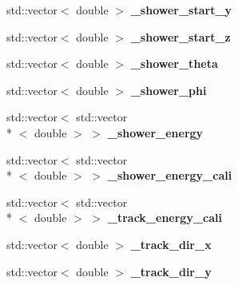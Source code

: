 \begin{DoxyCompactItemize}
\item 
\hypertarget{group__lee_gae12d2a6c7e2d78fc9d7e6f30ce959fa7}{std\-::vector$<$ double $>$ {\bfseries \-\_\-shower\-\_\-start\-\_\-y}}\label{group__lee_gae12d2a6c7e2d78fc9d7e6f30ce959fa7}

\item 
\hypertarget{group__lee_gafef1c0810411173778fa2ea099cbb03f}{std\-::vector$<$ double $>$ {\bfseries \-\_\-shower\-\_\-start\-\_\-z}}\label{group__lee_gafef1c0810411173778fa2ea099cbb03f}

\item 
\hypertarget{group__lee_ga3ad8af27c4c242410ffe4c1e1407e3c0}{std\-::vector$<$ double $>$ {\bfseries \-\_\-shower\-\_\-theta}}\label{group__lee_ga3ad8af27c4c242410ffe4c1e1407e3c0}

\item 
\hypertarget{group__lee_ga97c2d25dc1e253d867353b1c4562967c}{std\-::vector$<$ double $>$ {\bfseries \-\_\-shower\-\_\-phi}}\label{group__lee_ga97c2d25dc1e253d867353b1c4562967c}

\item 
\hypertarget{group__lee_gaf1fab9490fef935944f24feb7450f76c}{std\-::vector$<$ std\-::vector\\*
$<$ double $>$ $>$ {\bfseries \-\_\-shower\-\_\-energy}}\label{group__lee_gaf1fab9490fef935944f24feb7450f76c}

\item 
\hypertarget{group__lee_gac5a201dfcee71af90a4076c07a959ebf}{std\-::vector$<$ std\-::vector\\*
$<$ double $>$ $>$ {\bfseries \-\_\-shower\-\_\-energy\-\_\-cali}}\label{group__lee_gac5a201dfcee71af90a4076c07a959ebf}

\item 
\hypertarget{group__lee_gabc42592a0839c13f76a4eb677328cfb3}{std\-::vector$<$ std\-::vector\\*
$<$ double $>$ $>$ {\bfseries \-\_\-track\-\_\-energy\-\_\-cali}}\label{group__lee_gabc42592a0839c13f76a4eb677328cfb3}

\item 
\hypertarget{group__lee_ga8a992d49401db441d8c6e890ce1c1bce}{std\-::vector$<$ double $>$ {\bfseries \-\_\-track\-\_\-dir\-\_\-x}}\label{group__lee_ga8a992d49401db441d8c6e890ce1c1bce}

\item 
\hypertarget{group__lee_ga28bd177e5a7cacbd35fb5aec0865cd57}{std\-::vector$<$ double $>$ {\bfseries \-\_\-track\-\_\-dir\-\_\-y}}\label{group__lee_ga28bd177e5a7cacbd35fb5aec0865cd57}


\end{DoxyCompactItemize}
